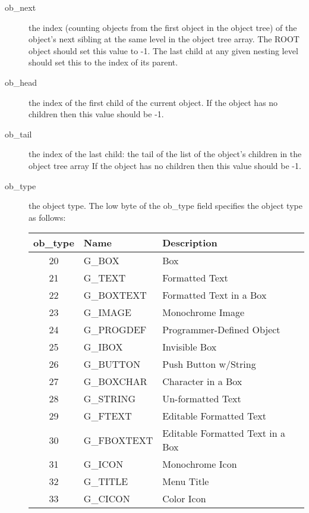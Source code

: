 \begin{description}

\item[ob\_next] the index (counting objects from the first object in the
object tree) of the object's next sibling at the same level in the object tree
array. The ROOT object should set this value to -1. The last child at any given
nesting level should set this to the index of its parent.

\item[ob\_head] the index of the first child of the current object. If the
object has no children then this value should be -1. 

\item[ob\_tail] the index of the last child: the tail of the list of the
object's children in the object tree array If the object has no children then
this value should be -1.

\item[ob\_type] the object type. The low byte of the ob\_type field 
specifies the object type as follows:

\begin{center}\begin{longtable}{|cll|}
\hline
{\bf ob\_type} & {\bf Name} & {\bf Description}\\
\hline
  20 &  G\_BOX	    &   Box		\\	    
  21 &  G\_TEXT	    &   Formatted Text  \\	    
  22 &  G\_BOXTEXT   &   Formatted Text in a Box \\
  23 &  G\_IMAGE     &   Monochrome Image	\\    
  24 &  G\_PROGDEF   &   Programmer-Defined Object\\
  25 &  G\_IBOX	    &   Invisible Box		  \\  
  26 &  G\_BUTTON    &   Push Button w/String	   \\ 
  27 &  G\_BOXCHAR   &   Character in a Box	   \\ 
  28 &  G\_STRING    &   Un-formatted Text	   \\ 
  29 &  G\_FTEXT     &   Editable Formatted Text \\
  30 &  G\_FBOXTEXT  &   Editable Formatted Text in a Box\\
  31 &  G\_ICON	    &   Monochrome Icon \\
  32 &  G\_TITLE     &   Menu Title\\
  33 &  G\_CICON     &   Color Icon \\
\hline
\end{longtable}\end{center}


\end{description}
